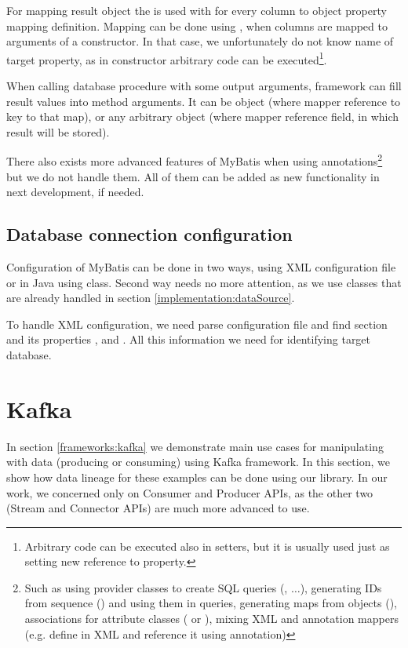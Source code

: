 For mapping result object the  is used with 
for every column to object property mapping definition.
Mapping can be done using , when columns are mapped
to arguments of a constructor. In that case, we unfortunately do not know
name of target property, as in constructor arbitrary code can be executed\footnote{
  Arbitrary code can be executed also in setters, but it is usually used
  just as setting new reference to property.
}.

When calling database procedure with some output arguments,
framework can fill result values into method arguments.
It can be  object (where mapper reference to key to that map),
or any arbitrary object (where mapper reference field, in which result will be stored).

There also exists more advanced features of MyBatis when using annotations\footnote{
  Such as using provider classes to create SQL queries (, $\ldots$),
  generating IDs from sequence () and using them in queries,
  generating maps from objects (),
  associations for attribute classes ( or ),
  mixing XML and annotation mappers (e.g. define  in XML and reference it
  using  annotation)}
but we do not handle them. All of them can be added as new functionality in next development,
if needed.




\subsection{Database connection configuration}

Configuration of MyBatis can be done in two ways, using XML configuration file
or in Java using  class. Second way needs no more attention,
as we use  classes that are already handled in section \ref{implementation:dataSource}.

To handle XML configuration, we need parse configuration file and find 
section and its properties ,  and . All this
information we need for identifying target database.




\section{Kafka}

In section \ref{frameworks:kafka} we demonstrate main use cases
for manipulating with data (producing or consuming) using Kafka framework.
In this section, we show how data lineage for these examples can be done
using our library. In our work, we concerned only on Consumer and Producer APIs,
as the other two (Stream and Connector APIs) are much more advanced to use.



